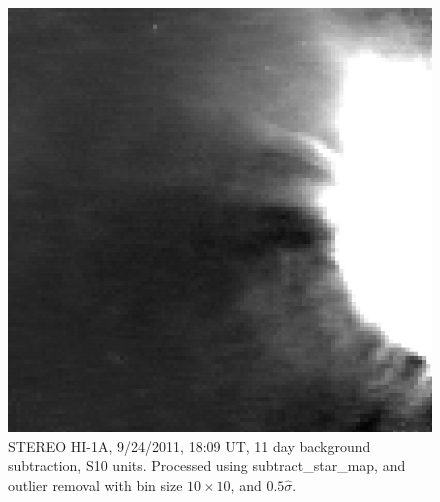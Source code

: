 \begin{figure}
  \centering
  \includegraphics[scale=0.5]{../IMAGES/20110924_180901_24h1A_br11_NO_STARS_NO_STARS_0010_05stdev_contrast_32_190.jpg} 
  \caption{STEREO HI-1A, 9/24/2011, 18:09 UT, 11 day background subtraction, S10 units. Processed using subtract\_star\_map, and outlier removal with bin size $10 \times 10$, and $0.5 \hat{\sigma}$.}
  \label{fig:hi1a_subtract_star_map_0010bin_05stdev}
\end{figure}
%
























